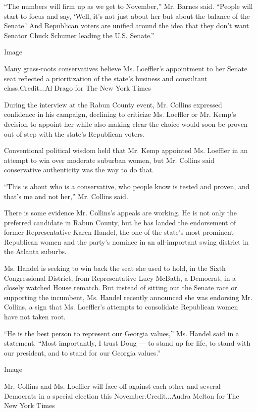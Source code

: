 ``The numbers will firm up as we get to November,'' Mr. Barnes said.
``People will start to focus and say, `Well, it's not just about her but
about the balance of the Senate.' And Republican voters are unified
around the idea that they don't want Senator Chuck Schumer leading the
U.S. Senate.''

Image

Many grass-roots conservatives believe Ms. Loeffler's appointment to her
Senate seat reflected a prioritization of the state's business and
consultant class.Credit...Al Drago for The New York Times

During the interview at the Rabun County event, Mr. Collins expressed
confidence in his campaign, declining to criticize Ms. Loeffler or Mr.
Kemp's decision to appoint her while also making clear the choice would
soon be proven out of step with the state's Republican voters.

Conventional political wisdom held that Mr. Kemp appointed Ms. Loeffler
in an attempt to win over moderate suburban women, but Mr. Collins said
conservative authenticity was the way to do that.

``This is about who is a conservative, who people know is tested and
proven, and that's me and not her,'' Mr. Collins said.

There is some evidence Mr. Collins's appeals are working. He is not only
the preferred candidate in Rabun County, but he has landed the
endorsement of former Representative Karen Handel, the one of the
state's most prominent Republican women and the party's nominee in an
all-important swing district in the Atlanta suburbs.

Ms. Handel is seeking to win back the seat she used to hold, in the
Sixth Congressional District, from Representative Lucy McBath, a
Democrat, in a closely watched House rematch. But instead of sitting out
the Senate race or supporting the incumbent, Ms. Handel recently
announced she was endorsing Mr. Collins, a sign that Ms. Loeffler's
attempts to consolidate Republican women have not taken root.

``He is the best person to represent our Georgia values,'' Ms. Handel
said in a statement. ``Most importantly, I trust Doug --- to stand up
for life, to stand with our president, and to stand for our Georgia
values.''

Image

Mr. Collins and Ms. Loeffler will face off against each other and
several Democrats in a special election this November.Credit...Audra
Melton for The New York Times


